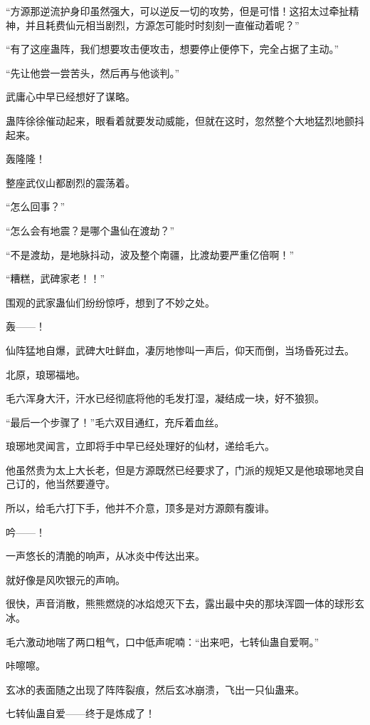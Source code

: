 \begin{this_body}
“方源那逆流护身印虽然强大，可以逆反一切的攻势，但是可惜！这招太过牵扯精神，并且耗费仙元相当剧烈，方源怎可能时时刻刻一直催动着呢？”

“有了这座蛊阵，我们想要攻击便攻击，想要停止便停下，完全占据了主动。”

“先让他尝一尝苦头，然后再与他谈判。”

武庸心中早已经想好了谋略。

蛊阵徐徐催动起来，眼看着就要发动威能，但就在这时，忽然整个大地猛烈地颤抖起来。

轰隆隆！

整座武仪山都剧烈的震荡着。

“怎么回事？”

“怎么会有地震？是哪个蛊仙在渡劫？”

“不是渡劫，是地脉抖动，波及整个南疆，比渡劫要严重亿倍啊！”

“糟糕，武碑家老！！”

围观的武家蛊仙们纷纷惊呼，想到了不妙之处。

轰——！

仙阵猛地自爆，武碑大吐鲜血，凄厉地惨叫一声后，仰天而倒，当场昏死过去。

北原，琅琊福地。

毛六浑身大汗，汗水已经彻底将他的毛发打湿，凝结成一块，好不狼狈。

“最后一个步骤了！”毛六双目通红，充斥着血丝。

琅琊地灵闻言，立即将手中早已经处理好的仙材，递给毛六。

他虽然贵为太上大长老，但是方源既然已经要求了，门派的规矩又是他琅琊地灵自己订的，他当然要遵守。

所以，给毛六打下手，他并不介意，顶多是对方源颇有腹诽。

吟——！

一声悠长的清脆的响声，从冰炎中传达出来。

就好像是风吹银元的声响。

很快，声音消散，熊熊燃烧的冰焰熄灭下去，露出最中央的那块浑圆一体的球形玄冰。

毛六激动地喘了两口粗气，口中低声呢喃：“出来吧，七转仙蛊自爱啊。”

咔嚓嚓。

玄冰的表面随之出现了阵阵裂痕，然后玄冰崩溃，飞出一只仙蛊来。

七转仙蛊自爱——终于是炼成了！

\end{this_body}

